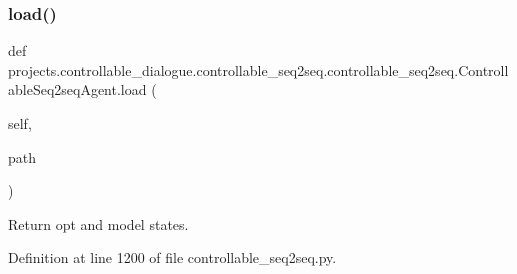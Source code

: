 \subsubsection{\texorpdfstring{load()}{load()}}
{\footnotesize\ttfamily def projects.\+controllable\+\_\+dialogue.\+controllable\+\_\+seq2seq.\+controllable\+\_\+seq2seq.\+Controllable\+Seq2seq\+Agent.\+load (\begin{DoxyParamCaption}\item[{}]{self,  }\item[{}]{path }\end{DoxyParamCaption})}

\begin{DoxyVerb}Return opt and model states.
\end{DoxyVerb}
 

Definition at line 1200 of file controllable\+\_\+seq2seq.\+py.


